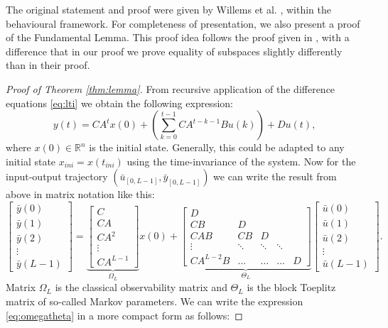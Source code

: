 \documentclass[12pt,a4paper]{report}
\begin{document}
The original statement and proof were given by Willems et al. \cite{willems2005note}, within the behavioural framework. For completeness of presentation, we also present a proof of the Fundamental Lemma. This proof idea follows
the proof given in \cite{dbcbook}, with a difference that in our proof we prove equality of subspaces slightly differently than in their proof.
\begin{proof}[Proof of Theorem \ref{thm:lemma}]
    From recursive application of the difference equations \eqref{eq:lti} we obtain the following expression:
    \begin{equation}
        y(t) = CA^{t}x(0) + \left(\sum_{k=0}^{t-1}CA^{t - k - 1}Bu(k)\right) + Du(t),
    \end{equation}
    where $x(0) \in \mathbb{R}^n$ is the initial state. Generally, this could be adapted to any initial state $x_{ini} = x(t_{ini})$ using the time-invariance of the system. Now for the input-output
    trajectory \((\bar{u}_{[0, L-1]}, \bar{y}_{[0, L-1]})\) we can write the result from above in matrix notation like this:
    \begin{equation}
        \begin{bmatrix} \bar{y}(0) \\ \bar{y}(1) \\ \bar{y}(2) \\ \vdots \\ \bar{y}(L-1)\end{bmatrix} =
        \underbrace{\begin{bmatrix} C \\ CA \\ CA^2 \\ \vdots \\ CA^{L-1} \end{bmatrix}}_\text{$\Omega_L$}x(0) +
        \underbrace{\begin{bmatrix} D \\ CB & D \\ CAB & CB & D \\ \vdots & \ddots & \ddots & \ddots \\ CA^{L-2}B & \dots & \dots & \dots & D\end{bmatrix}}_\text{$\Theta_L$}
        \begin{bmatrix} \bar{u}(0) \\ \bar{u}(1) \\ \bar{u}(2) \\ \vdots \\ \bar{u}(L-1)\end{bmatrix}.
        \label{eq:omegatheta}
    \end{equation}
    Matrix  $\Omega_L$ is the classical observability matrix and  $\Theta_L$ is the block Toeplitz matrix of so-called Markov parameters. We can write the expression
    \eqref{eq:omegatheta} in a more compact form as follows:


\end{proof}
\end{document}
